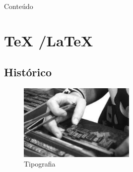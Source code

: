 






% 


\begin {frame}{Conteúdo}
\begin{multicols}{2}
  \tableofcontents
\end{multicols}
\end {frame}

\section {\TeX{} /\LaTeX{}}
\subsection {Histórico}
\begin{frame}
\begin{figure}[htbp]
    \centering
        \includegraphics[width=0.5\textwidth]{figuras/tipografia.jpeg}
    \caption{Tipografia}
    \label{fig:tipografia}
\end{figure}
\end{frame}

